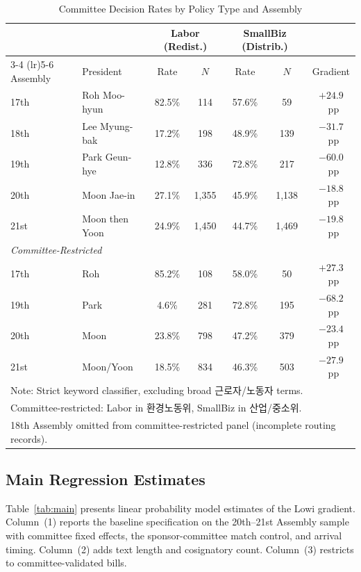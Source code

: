 \documentclass[11pt]{article}
\begin{document}
\begin{table}[H]
\centering
\caption{Committee Decision Rates by Policy Type and Assembly}
\label{tab:rates}
\begin{tabular}{llccccc}
\toprule
 & & \multicolumn{2}{c}{Labor (Redist.)} & \multicolumn{2}{c}{SmallBiz (Distrib.)} & \\
\cmidrule(lr){3-4} \cmidrule(lr){5-6}
Assembly & President & Rate & $N$ & Rate & $N$ & Gradient \\
\midrule
17th & Roh Moo-hyun        & 82.5\% & 114   & 57.6\% & 59    & $+24.9$~pp \\
18th & Lee Myung-bak       & 17.2\% & 198   & 48.9\% & 139   & $-31.7$~pp \\
19th & Park Geun-hye       & 12.8\% & 336   & 72.8\% & 217   & $-60.0$~pp \\
20th & Moon Jae-in         & 27.1\% & 1,355 & 45.9\% & 1,138 & $-18.8$~pp \\
21st & Moon then Yoon      & 24.9\% & 1,450 & 44.7\% & 1,469 & $-19.8$~pp \\
\midrule
\multicolumn{2}{l}{\textit{Committee-Restricted}} & & & & & \\
17th & Roh               & 85.2\% & 108   & 58.0\% & 50    & $+27.3$~pp \\
19th & Park              & 4.6\%  & 281   & 72.8\% & 195   & $-68.2$~pp \\
20th & Moon              & 23.8\% & 798   & 47.2\% & 379   & $-23.4$~pp \\
21st & Moon/Yoon         & 18.5\% & 834   & 46.3\% & 503   & $-27.9$~pp \\
\bottomrule
\multicolumn{7}{l}{\footnotesize Note: Strict keyword classifier, excluding broad 근로자/노동자 terms.} \\
\multicolumn{7}{l}{\footnotesize Committee-restricted: Labor in 환경노동위, SmallBiz in 산업/중소위.} \\
\multicolumn{7}{l}{\footnotesize 18th Assembly omitted from committee-restricted panel (incomplete routing records).} \\
\end{tabular}
\end{table}

\subsection{Main Regression Estimates}

Table~\ref{tab:main} presents linear probability model estimates of the Lowi gradient. Column~(1) reports the baseline specification on the 20th--21st Assembly sample with committee fixed effects, the sponsor-committee match control, and arrival timing. Column~(2) adds text length and cosignatory count. Column~(3) restricts to committee-validated bills.
\end{document}
